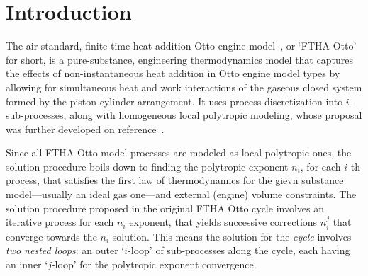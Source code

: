 \section{Introduction}

    The air-standard, finite-time heat addition Otto engine model~\cite{2017-NaaktgeborenC-IntJMechEngEduc}, or `FTHA Otto'  for
    short, is a pure-substance, engineering thermodynamics model that captures the effects of non-instantaneous heat addition in
    Otto engine model types by allowing for simultaneous heat and work interactions of the gaseous closed system formed  by  the
    piston-cylinder arrangement. It uses process discretization into $i$-sub-processes, along with homogeneous local  polytropic
    modeling, whose proposal was further developed on reference~\cite{2020-NaaktgeborenC-Polytropic-engrXiv-rev02}.

    Since all FTHA Otto model processes are modeled as local polytropic ones, the solution procedure boils down to  finding  the
    polytropic exponent $n_i$, for each $i$-th process, that satisfies the first law of thermodynamics for the  gievn  substance
    model---usually an ideal gas one---and external (engine) volume constraints. The solution procedure proposed in the original
    FTHA Otto cycle involves an iterative process for each $n_i$ exponent,  that  yields  successive  corrections  $n_i^j$  that
    converge towards the $n_i$ solution. This means the solution for the \emph{cycle} involves \emph{two nested loops}: an outer
    `$i$-loop' of sub-processes along the cycle, each having an inner `$j$-loop' for the polytropic exponent convergence.

    


